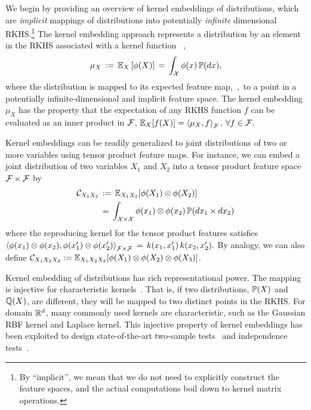 \documentclass{article}
\begin{document}
We begin by providing an overview of kernel embeddings of distributions, which are \emph{implicit} mappings of distributions into potentially \emph{infinite} dimensional RKHS.\footnote{By ``implicit'', we mean that we do not need to explicitly construct the feature spaces, and the actual computations boil down to kernel matrix operations.} The kernel embedding approach represents a distribution by an element in the RKHS associated with a kernel function \, \cite{SmoGreSonSch07,SriGreFukLanetal08},
\begin{align}
  \mu_{X} \, := \, \mathbb{E}_{X} \left[\phi(X)\right] \, = \, \int_{\mathcal{X}} \phi(x) \, \mathbb{P}(dx),  \label{eq:embedding}
\end{align}
where the distribution is mapped to its expected feature map,~\ie,~to a point in a potentially infinite-dimensional and implicit feature space.
 The kernel embedding $\mu_{X}$ has the property that the expectation of any RKHS function $f$ can be evaluated as an inner product in $\mathcal{F}$,
$
  \mathbb{E}_{X} [f(X)] = \left\langle \mu_{X},f \right\rangle_{\mathcal{F}}, \, \forall f\in\mathcal{F}.
$

Kernel embeddings can be readily generalized to joint distributions of two or more variables using tensor product feature maps. For instance, we can embed a joint distribution of two variables $X_1$ and $X_2$ into a tensor product feature space $\mathcal{F}\times \mathcal{F}$ by
\begin{align}
    \mathcal{C}_{X_1X_2} \, &:= \, \mathbb{E}_{X_1X_2}[\phi(X_1)\otimes \phi(X_2)] \\
    \, &= \, \int_{\mathcal{X} \times \mathcal{X}} \phi(x_1) \otimes \phi(x_2) \, \mathbb{P}(dx_1 \times dx_2)
\end{align}
where the reproducing kernel for the tensor product features satisfies
$
	\left\langle \phi(x_1)\otimes \phi(x_2) ,\phi(x_1')\otimes \phi(x_2')  \right\rangle_{\mathcal{F}\times \mathcal{F}} \, = \,  k(x_1,x_1')\,k(x_2,x_2').
$
By analogy, we can also define $\mathcal{C}_{X_1X_2X_3} := \mathbb{E}_{X_1X_2X_3}[\phi(X_1)\otimes\phi(X_2)\otimes \phi(X_3)]$.

Kernel embedding of distributions has rich representational power. The mapping is injective for characteristic kernels~\cite{SriGreFukLanetal08}. That is, if two distributions, $\mathbb{P}(X)$ and $\mathbb{Q}(X)$, are different, they will be mapped to two distinct points in the RKHS. For domain $\mathbb{R}^d$, many commonly used kernels are characteristic, such as the Gaussian RBF kernel and Laplace kernel.
This injective property of kernel embeddings has been exploited to design  state-of-the-art two-sample tests~\cite{GreBorRasSchetal12} and  independence tests~\cite{GreFukTeoSonetal08}.
\end{document}
